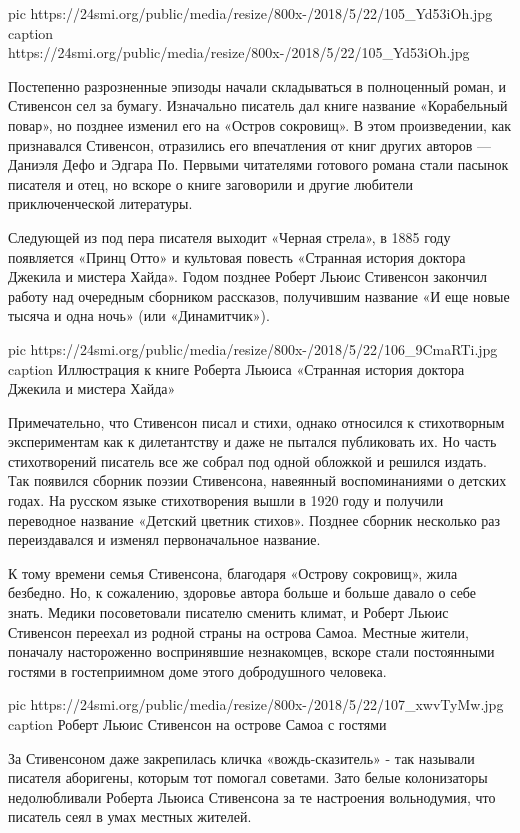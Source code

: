 \ifcmt
pic https://24smi.org/public/media/resize/800x-/2018/5/22/105_Yd53iOh.jpg
caption https://24smi.org/public/media/resize/800x-/2018/5/22/105_Yd53iOh.jpg
\fi

Постепенно разрозненные эпизоды начали складываться в полноценный роман, и
Стивенсон сел за бумагу. Изначально писатель дал книге название
«Корабельный повар», но позднее изменил его на «Остров сокровищ». В этом
произведении, как признавался Стивенсон, отразились его впечатления от
книг других авторов — Даниэля Дефо и Эдгара По. Первыми читателями
готового романа стали пасынок писателя и отец, но вскоре о книге
заговорили и другие любители приключенческой литературы.

Следующей из под пера писателя выходит «Черная стрела», в 1885 году
появляется «Принц Отто» и культовая повесть «Странная история доктора
Джекила и мистера Хайда». Годом позднее Роберт Льюис Стивенсон закончил
работу над очередным сборником рассказов, получившим название «И еще новые
тысяча и одна ночь» (или «Динамитчик»).

\ifcmt
pic https://24smi.org/public/media/resize/800x-/2018/5/22/106_9CmaRTi.jpg
caption Иллюстрация к книге Роберта Льюиса «Странная история доктора Джекила и мистера Хайда»
\fi


Примечательно, что Стивенсон писал и стихи, однако относился к стихотворным
экспериментам как к дилетантству и даже не пытался публиковать их. Но часть
стихотворений писатель все же собрал под одной обложкой и решился издать. Так
появился сборник поэзии Стивенсона, навеянный воспоминаниями о детских годах.
На русском языке стихотворения вышли в 1920 году и получили переводное название
«Детский цветник стихов».  Позднее сборник несколько раз переиздавался и
изменял первоначальное название.

К тому времени семья Стивенсона, благодаря «Острову сокровищ», жила безбедно.
Но, к сожалению, здоровье автора больше и больше давало о себе знать. Медики
посоветовали писателю сменить климат, и Роберт Льюис Стивенсон переехал из
родной страны на острова Самоа. Местные жители, поначалу настороженно
воспринявшие незнакомцев, вскоре стали постоянными гостями в гостеприимном доме
этого добродушного человека.

\ifcmt
pic https://24smi.org/public/media/resize/800x-/2018/5/22/107_xwvTyMw.jpg
caption Роберт Льюис Стивенсон на острове Самоа с гостями
\fi

За Стивенсоном даже закрепилась кличка «вождь-сказитель» - так называли
писателя аборигены, которым тот помогал советами. Зато белые колонизаторы
недолюбливали Роберта Льюиса Стивенсона за те настроения вольнодумия, что
писатель сеял в умах местных жителей.

